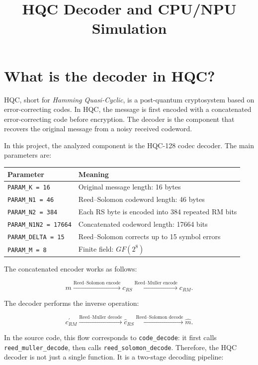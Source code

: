 \documentclass[12pt,a4paper]{article}
\title{HQC Decoder and CPU/NPU Simulation}
\author{}
\date{}
\begin{document}
\maketitle

\section{What is the decoder in HQC?}

HQC, short for \textit{Hamming Quasi-Cyclic}, is a post-quantum cryptosystem based on error-correcting codes. In HQC, the message is first encoded with a concatenated error-correcting code before encryption. The decoder is the component that recovers the original message from a noisy received codeword.

In this project, the analyzed component is the HQC-128 codec decoder. The main parameters are:

\begin{center}
\begin{tabular}{ll}
\toprule
Parameter & Meaning \\
\midrule
\texttt{PARAM\_K = 16} & Original message length: 16 bytes \\
\texttt{PARAM\_N1 = 46} & Reed--Solomon codeword length: 46 bytes \\
\texttt{PARAM\_N2 = 384} & Each RS byte is encoded into 384 repeated RM bits \\
\texttt{PARAM\_N1N2 = 17664} & Concatenated codeword length: 17664 bits \\
\texttt{PARAM\_DELTA = 15} & Reed--Solomon corrects up to 15 symbol errors \\
\texttt{PARAM\_M = 8} & Finite field: $GF(2^8)$ \\
\bottomrule
\end{tabular}
\end{center}

The concatenated encoder works as follows:

\[
m \xrightarrow{\text{Reed--Solomon encode}} c_{RS}
\xrightarrow{\text{Reed--Muller encode}} c_{RM}.
\]

The decoder performs the inverse operation:

\[
c_{RM}^{'} \xrightarrow{\text{Reed--Muller decode}} \hat{c}_{RS}
\xrightarrow{\text{Reed--Solomon decode}} \hat{m}.
\]

In the source code, this flow corresponds to \texttt{code\_decode}: it first calls \texttt{reed\_muller\_decode}, then calls \texttt{reed\_solomon\_decode}. Therefore, the HQC decoder is not just a single function. It is a two-stage decoding pipeline:
\end{document}
